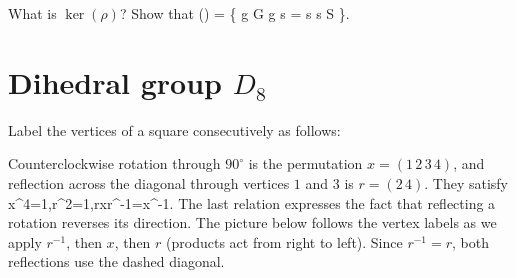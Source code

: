 \documentclass[reqno,11pt]{amsart}
\begin{document}
\begin{exercise} What is $\ker(\rho)$? Show that \be{} \ker(\rho) = \{ g \in G \mid g \circ s = s  s \in S \}. \ee \end{exercise}

\section{Dihedral group $D_8$}


Label the vertices of a square consecutively as follows:
\begin{center}
\end{center}
Counterclockwise rotation through $90^\circ$ is the permutation
$x=(1\,2\,3\,4)$, and reflection across the diagonal through vertices
$1$ and $3$ is $r=(2\,4)$. They satisfy
\be{} \label{dihedral-rel}
  x^4=1,\qquad r^2=1,\qquad rxr^{-1}=x^{-1}.
\ee
The last relation expresses the fact that reflecting a rotation reverses
its direction. The picture below follows the vertex labels as we apply
$r^{-1}$, then $x$, then $r$ (products act from right to left).
Since $r^{-1}=r$, both reflections use the dashed diagonal.
\end{document}
